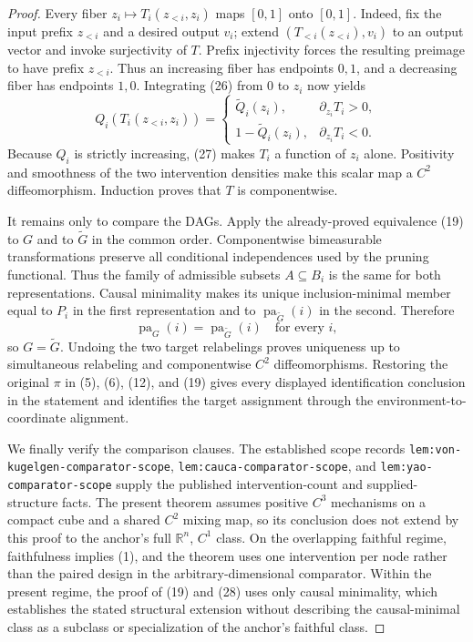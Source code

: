 \documentclass{article}
\begin{document}
\begin{proof}
Every fiber \(z_i\mapsto T_i(z_{<i},z_i)\) maps \([0,1]\) onto \([0,1]\).  Indeed, fix the input prefix \(z_{<i}\) and a desired output \(v_i\); extend \((T_{<i}(z_{<i}),v_i)\) to an output vector and invoke surjectivity of \(T\).  Prefix injectivity forces the resulting preimage to have prefix \(z_{<i}\).  Thus an increasing fiber has endpoints \(0,1\), and a decreasing fiber has endpoints \(1,0\).  Integrating (26) from \(0\) to \(z_i\) now yields
\[
 Q_i(T_i(z_{<i},z_i))=
 \begin{cases}
 \widetilde Q_i(z_i),&\partial_{z_i}T_i>0,\\[3pt]
 1-\widetilde Q_i(z_i),&\partial_{z_i}T_i<0.
 \end{cases}
\tag{27}
\]
Because \(Q_i\) is strictly increasing, (27) makes \(T_i\) a function of \(z_i\) alone.  Positivity and smoothness of the two intervention densities make this scalar map a \(C^2\) diffeomorphism.  Induction proves that \(T\) is componentwise.

It remains only to compare the DAGs.  Apply the already-proved equivalence (19) to \(G\) and to \(\widetilde G\) in the common order.  Componentwise bimeasurable transformations preserve all conditional independences used by the pruning functional.  Thus the family of admissible subsets \(A\subseteq B_i\) is the same for both representations.  Causal minimality makes its unique inclusion-minimal member equal to \(P_i\) in the first representation and to \(\operatorname{pa}_{\widetilde G}(i)\) in the second.  Therefore
\[
 \operatorname{pa}_G(i)=\operatorname{pa}_{\widetilde G}(i)
 \quad\text{for every }i,
\tag{28}
\]
so \(G=\widetilde G\).  Undoing the two target relabelings proves uniqueness up to simultaneous relabeling and componentwise \(C^2\) diffeomorphisms.  Restoring the original \(\pi\) in (5), (6), (12), and (19) gives every displayed identification conclusion in the statement and identifies the target assignment through the environment-to-coordinate alignment.

We finally verify the comparison clauses.  The established scope records \texttt{lem:von-kugelgen-comparator-scope}, \texttt{lem:cauca-comparator-scope}, and \texttt{lem:yao-comparator-scope} supply the published intervention-count and supplied-structure facts.  The present theorem assumes positive \(C^3\) mechanisms on a compact cube and a shared \(C^2\) mixing map, so its conclusion does not extend by this proof to the anchor's full \(\mathbb R^n\), \(C^1\) class.  On the overlapping faithful regime, faithfulness implies (1), and the theorem uses one intervention per node rather than the paired design in the arbitrary-dimensional comparator.  Within the present regime, the proof of (19) and (28) uses only causal minimality, which establishes the stated structural extension without describing the causal-minimal class as a subclass or specialization of the anchor's faithful class.


\end{proof}
\end{document}
